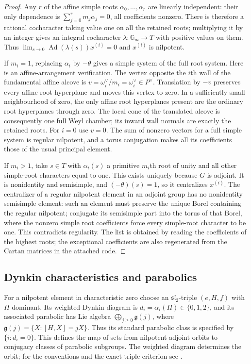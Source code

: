 \begin{proof}
Any $r$ of the affine simple roots $\alpha_0,\ldots,\alpha_r$ are
linearly independent: their only dependence is
$\sum_{j=0}^r m_j\alpha_j=0$, all coefficients nonzero.  There is
therefore a rational cocharacter taking value one on all the retained
roots; multiplying it by an integer gives an integral cocharacter
$\lambda:\mathbb G_m\to T$ with positive values on them.  Thus
$\lim_{s\to0}\operatorname{Ad}(\lambda(s))x^{(i)}=0$ and
$x^{(i)}$ is nilpotent.

If $m_i=1$, replacing $\alpha_i$ by $-\theta$ gives a simple system
of the full root system.  Here is an affine-arrangement verification.
The vertex opposite the $i$th wall of the fundamental affine alcove is
$v=\omega_i^\vee/m_i=\omega_i^\vee\in P^\vee$.
Translation by $-v$ preserves every affine root hyperplane and moves
this vertex to zero.  In a sufficiently small neighbourhood of zero,
the only affine root hyperplanes present are the ordinary root
hyperplanes through zero.  The local cone of the translated alcove
is consequently one full Weyl chamber; its inward wall normals are
exactly the retained roots.  For $i=0$ use $v=0$.
The sum of nonzero vectors for
a full simple system is regular nilpotent, and a torus conjugation
makes all its coefficients those of the usual principal element.

If $m_i>1$, take $s\in T$ with $\alpha_i(s)$ a primitive $m_i$th
root of unity and all other simple-root characters equal to one.
This exists uniquely because $G$ is adjoint.  It is nonidentity and
semisimple, and $(-\theta)(s)=1$, so it centralizes $x^{(i)}$.
The centralizer of a regular nilpotent element in an adjoint group
has no nonidentity semisimple element: such an element must preserve
the unique Borel containing the regular nilpotent; conjugate its
semisimple part into the torus of that Borel, where the nonzero simple
root coefficients force every simple-root character to be one.
This contradicts regularity.  The list is obtained by reading the
coefficients of the highest roots; the exceptional coefficients are
also regenerated from the Cartan matrices in the attached code.
\end{proof}

\subsection{Dynkin characteristics and parabolics}
For a nilpotent element in characteristic zero choose an
$\mathfrak{sl}_2$-triple $(e,H,f)$ with $H$ dominant.  Its weighted
Dynkin diagram is $d_i=\alpha_i(H)\in\{0,1,2\}$, and its associated
parabolic has Lie algebra $\bigoplus_{j\ge0}\mathfrak g(j)$, where
$\mathfrak g(j)=\{X:[H,X]=jX\}$.  Thus its standard parabolic class
is specified by $\{i:d_i=0\}$.  This defines the map of sets from
nilpotent adjoint orbits to conjugacy classes of parabolic subgroups.
The weighted diagram determines the orbit; for the conventions and
the exact triple criterion see \cite[\S\S2--3, Lemma 2]{D-deGraaf}.

